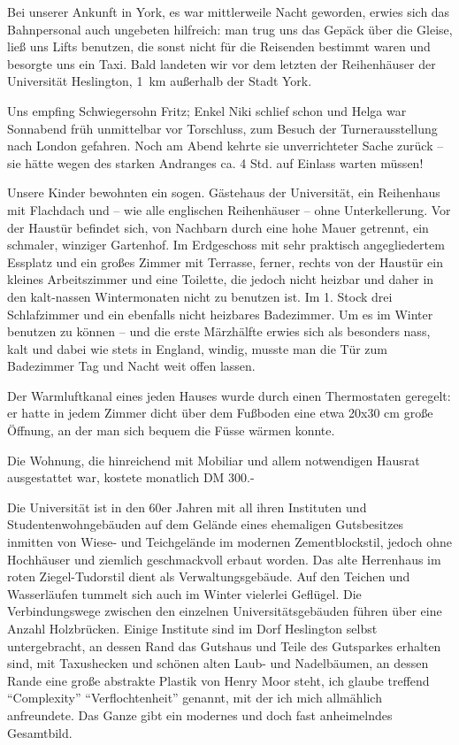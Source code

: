Bei unserer Ankunft in York, es war mittlerweile Nacht geworden, erwies sich das Bahnpersonal auch ungebeten hilfreich: man trug uns das Gepäck über die Gleise, ließ uns Lifts benutzen, die sonst nicht für die Reisenden bestimmt waren und besorgte uns ein Taxi. Bald landeten wir vor dem letzten der Reihenhäuser der Universität Heslington, 1~km außerhalb der Stadt York.

Uns empfing Schwiegersohn Fritz; Enkel Niki schlief schon und Helga war Sonnabend früh unmittelbar vor Torschluss, zum Besuch der Turnerausstellung nach London gefahren. Noch am Abend kehrte sie unverrichteter Sache zurück -- sie hätte wegen des starken Andranges ca. 4 Std. auf Einlass warten müssen!

Unsere Kinder bewohnten ein sogen. Gästehaus der Universität, ein Reihenhaus mit Flachdach und -- wie alle englischen Reihenhäuser -- ohne Unterkellerung. Vor der Haustür befindet sich, von Nachbarn durch eine hohe Mauer getrennt, ein schmaler, winziger Gartenhof. Im Erdgeschoss mit sehr praktisch angegliedertem Essplatz und ein großes Zimmer mit Terrasse, ferner, rechts von der Haustür ein kleines Arbeitszimmer und eine Toilette, die jedoch nicht heizbar und daher in den kalt-nassen Wintermonaten nicht zu benutzen ist. Im 1. Stock drei Schlafzimmer und ein ebenfalls nicht heizbares Badezimmer. Um es im Winter benutzen zu können -- und die erste Märzhälfte erwies sich als besonders nass, kalt und dabei wie stets in England, windig, musste man die Tür zum Badezimmer Tag und Nacht weit offen lassen.

Der Warmluftkanal eines jeden Hauses wurde durch einen Thermostaten geregelt: er hatte in jedem Zimmer dicht über dem Fußboden eine etwa 20x30 cm große Öffnung, an der man sich bequem die Füsse wärmen konnte.

Die Wohnung, die hinreichend mit Mobiliar und allem notwendigen Hausrat ausgestattet war, kostete monatlich DM 300.-

Die Universität ist in den 60er Jahren mit all ihren Instituten und Studentenwohngebäuden auf dem Gelände eines ehemaligen Gutsbesitzes inmitten von Wiese- und Teichgelände im modernen Zementblockstil, jedoch ohne Hochhäuser und ziemlich geschmackvoll erbaut worden. Das alte Herrenhaus im roten Ziegel-Tudorstil dient als Verwaltungsgebäude. Auf den Teichen und Wasserläufen tummelt sich auch im Winter vielerlei Geflügel. Die Verbindungswege zwischen den einzelnen Universitätsgebäuden führen über eine Anzahl Holzbrücken. Einige Institute sind im Dorf Heslington selbst untergebracht, an dessen Rand das Gutshaus und Teile des Gutsparkes erhalten sind, mit Taxushecken und schönen alten Laub- und Nadelbäumen, an dessen Rande eine große abstrakte Plastik von Henry Moor steht, ich glaube treffend \enquote{Complexity} \enquote{Verflochtenheit} genannt, mit der ich mich allmählich anfreundete. Das Ganze gibt ein modernes und doch fast anheimelndes Gesamtbild.

